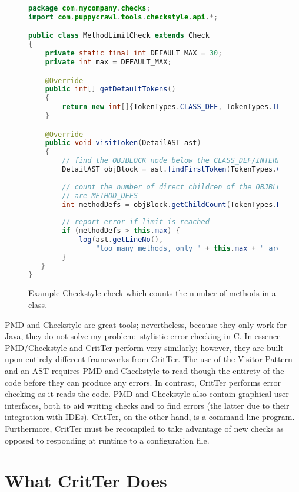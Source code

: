 \documentclass[12pt]{report}
\newcommand{\programName}{CritTer\xspace}
\begin{document}
\begin{figure}
\begin{lstlisting}[language=Java]
package com.mycompany.checks;
import com.puppycrawl.tools.checkstyle.api.*;

public class MethodLimitCheck extends Check
{
    private static final int DEFAULT_MAX = 30;
    private int max = DEFAULT_MAX;

    @Override
    public int[] getDefaultTokens()
    {
        return new int[]{TokenTypes.CLASS_DEF, TokenTypes.INTERFACE_DEF};
    }

    @Override
    public void visitToken(DetailAST ast)
    {
        // find the OBJBLOCK node below the CLASS_DEF/INTERFACE_DEF
        DetailAST objBlock = ast.findFirstToken(TokenTypes.OBJBLOCK);
        
        // count the number of direct children of the OBJBLOCK that 
        // are METHOD_DEFS
        int methodDefs = objBlock.getChildCount(TokenTypes.METHOD_DEF);
        
        // report error if limit is reached
        if (methodDefs > this.max) {
            log(ast.getLineNo(),
                "too many methods, only " + this.max + " are allowed");
        }
   }
}
\end{lstlisting}
\caption[Example Checkstyle Check]{Example Checkstyle check which counts the number of methods in a class.}
\label{checkstyle-rule}
\end{figure}

PMD and Checkstyle are great tools; nevertheless, because they only work for Java, they do not solve 
my problem:\ stylistic error checking in C. In essence PMD\slash Checkstyle and \programName perform 
very similarly; however, they are built upon entirely different frameworks from \programName. The use of 
the Visitor Pattern and an AST requires PMD and Checkstyle to read though the entirety of the code 
before they can produce any errors. In contrast, \programName performs error checking as it reads the 
code. PMD and Checkstyle also contain graphical user interfaces, both to aid writing checks and to find 
errors (the latter due to their integration with IDEs). \programName, on the other hand, is a command line 
program. Furthermore, \programName must be recompiled to take advantage of new checks as opposed 
to responding at runtime to a configuration file.

\chapter{What \programName Does}
\end{document}
